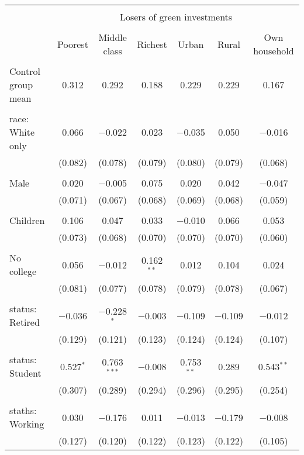 
\begin{tabular}{@{\extracolsep{5pt}}lcccccc} 
\\[-1.8ex]\hline 
\hline \\[-1.8ex] 
 & \multicolumn{6}{c}{Losers of green investments} \\ 
\cline{2-7} 
\\[-1.8ex] & Poorest & Middle class & Richest & Urban & Rural & Own household \\ 
\hline \\[-1.8ex] 
 Control group mean & 0.312 & 0.292 & 0.188 & 0.229 & 0.229 & 0.167  \\ \hline \\[-1.8ex] race: White only & 0.066 & $-$0.022 & 0.023 & $-$0.035 & 0.050 & $-$0.016 \\ 
  & (0.082) & (0.078) & (0.079) & (0.080) & (0.079) & (0.068) \\ 
  & & & & & & \\ 
 Male & 0.020 & $-$0.005 & 0.075 & 0.020 & 0.042 & $-$0.047 \\ 
  & (0.071) & (0.067) & (0.068) & (0.069) & (0.068) & (0.059) \\ 
  & & & & & & \\ 
 Children & 0.106 & 0.047 & 0.033 & $-$0.010 & 0.066 & 0.053 \\ 
  & (0.073) & (0.068) & (0.070) & (0.070) & (0.070) & (0.060) \\ 
  & & & & & & \\ 
 No college & 0.056 & $-$0.012 & 0.162$^{**}$ & 0.012 & 0.104 & 0.024 \\ 
  & (0.081) & (0.077) & (0.078) & (0.079) & (0.078) & (0.067) \\ 
  & & & & & & \\ 
 status: Retired & $-$0.036 & $-$0.228$^{*}$ & $-$0.003 & $-$0.109 & $-$0.109 & $-$0.012 \\ 
  & (0.129) & (0.121) & (0.123) & (0.124) & (0.124) & (0.107) \\ 
  & & & & & & \\ 
 status: Student & 0.527$^{*}$ & 0.763$^{***}$ & $-$0.008 & 0.753$^{**}$ & 0.289 & 0.543$^{**}$ \\ 
  & (0.307) & (0.289) & (0.294) & (0.296) & (0.295) & (0.254) \\ 
  & & & & & & \\ 
 staths: Working & 0.030 & $-$0.176 & 0.011 & $-$0.013 & $-$0.179 & $-$0.008 \\ 
  & (0.127) & (0.120) & (0.122) & (0.123) & (0.122) & (0.105) \\ 

\end{tabular}
